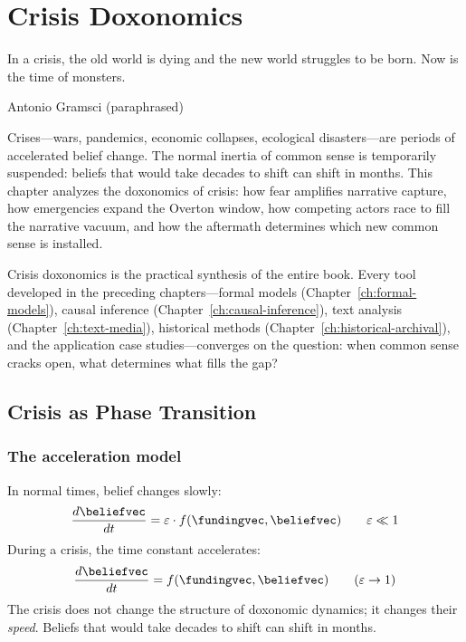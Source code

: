 \chapter{Crisis Doxonomics}
\label{ch:crisis-doxonomics}

\epigraph{In a crisis, the old world is dying and the new world struggles to be born. Now is the time of monsters.}{Antonio Gramsci (paraphrased)}

\noindent
Crises---wars, pandemics, economic collapses, ecological disasters---are periods of accelerated belief change.
The normal inertia of common sense is temporarily suspended: beliefs that would take decades to shift can shift in months.
This chapter analyzes the doxonomics of crisis: how fear amplifies narrative capture, how emergencies expand the Overton window, how competing actors race to fill the narrative vacuum, and how the aftermath determines which new common sense is installed.

Crisis doxonomics is the practical synthesis of the entire book.
Every tool developed in the preceding chapters---formal models (Chapter~\ref{ch:formal-models}), causal inference (Chapter~\ref{ch:causal-inference}), text analysis (Chapter~\ref{ch:text-media}), historical methods (Chapter~\ref{ch:historical-archival}), and the application case studies---converges on the question: when common sense cracks open, what determines what fills the gap?

\section{Crisis as Phase Transition}
\label{sec:ch29-phase}

\subsection{The acceleration model}

\begin{model}
\label{mod:crisis}
In normal times, belief changes slowly:
\[
  \frac{d\beliefvec}{dt} = \varepsilon \cdot f(\fundingvec, \beliefvec) \qquad \varepsilon \ll 1
\]
During a crisis, the time constant accelerates:
\[
  \frac{d\beliefvec}{dt} = f(\fundingvec, \beliefvec) \qquad (\varepsilon \to 1)
\]
The crisis does not change the structure of doxonomic dynamics; it changes their \emph{speed}.
Beliefs that would take decades to shift can shift in months.
\end{model}

